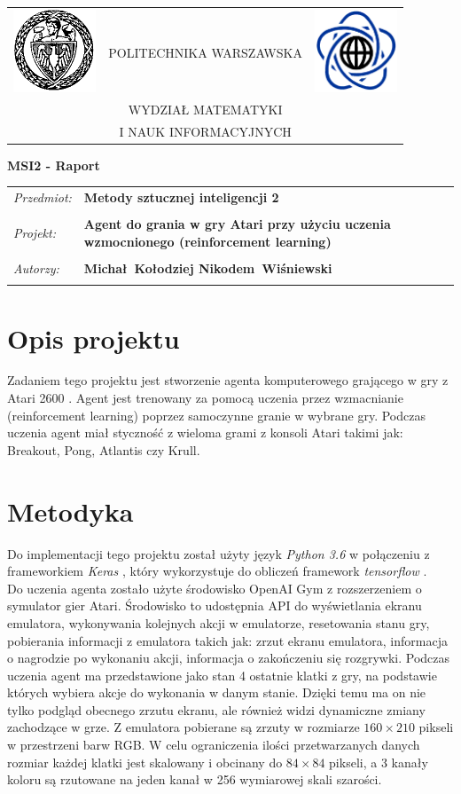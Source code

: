 \documentclass[12pt]{article}
\renewcommand{\maketitle}{
\begin{titlepage}
\begin{table}[t]
\centering
\begin{tabular}[t]{lcr}
 \includegraphics[width=70pt,height=70pt]{PW} & POLITECHNIKA WARSZAWSKA & \includegraphics[width=70pt,height=70pt]{MiNI}\\
& WYDZIAŁ MATEMATYKI & \\
& I NAUK INFORMACYJNYCH &
\end{tabular}
\end{table}
\vspace*{3cm}
  \begin{center}
    \LARGE
    \textbf {MSI2 - Raport}\\
   \vspace*{2 cm}
\begin{table}[!htp]
\begin{tabular}{p{4cm}p{9cm}}
\textit{Przedmiot:} &\textbf {Metody sztucznej inteligencji 2} \\
\\
\textit{Projekt:} &\textbf {Agent do grania w gry Atari przy użyciu uczenia wzmocnionego (reinforcement learning)} \\
\\
\textit{Autorzy:} &\textbf {Michał~Kołodziej \newline Nikodem~Wiśniewski} \\
\\
\end{tabular}
\end{table}

\vspace{5 cm}
  \center{\small Warszawa, dnia \today}
\end{center}
\end{titlepage}
}
\begin{document}
\maketitle

\tableofcontents

\newpage

\section{Opis projektu}
Zadaniem tego projektu jest stworzenie agenta komputerowego grającego w gry z Atari 2600 \cite{atari}. Agent jest trenowany za pomocą uczenia przez wzmacnianie (reinforcement learning) poprzez samoczynne granie w wybrane gry. Podczas uczenia agent miał styczność z wieloma grami z konsoli Atari takimi jak: Breakout, Pong, Atlantis czy Krull.

\section{Metodyka}

Do implementacji tego projektu został użyty język \textit{Python 3.6} w połączeniu z frameworkiem \textit{Keras} \cite{keras}, który wykorzystuje do obliczeń framework \textit{tensorflow} \cite{tensorflow}. \\
Do uczenia agenta zostało użyte środowisko OpenAI Gym \cite{gym} z rozszerzeniem o symulator gier Atari. Środowisko to udostępnia API do wyświetlania ekranu emulatora, wykonywania kolejnych akcji w emulatorze, resetowania stanu gry, pobierania informacji z emulatora takich jak: zrzut ekranu emulatora, informacja o nagrodzie po wykonaniu akcji, informacja o zakończeniu się rozgrywki. Podczas uczenia agent ma przedstawione jako stan 4 ostatnie klatki z gry, na podstawie których wybiera akcje do wykonania w danym stanie. Dzięki temu ma on nie tylko podgląd obecnego zrzutu ekranu, ale również widzi dynamiczne zmiany zachodzące w grze. Z emulatora pobierane są zrzuty w rozmiarze $160\times210$ pikseli w przestrzeni barw RGB. W celu ograniczenia ilości przetwarzanych danych rozmiar każdej klatki jest skalowany i obcinany do $84\times84$ pikseli, a 3 kanały koloru są rzutowane na jeden kanał w 256 wymiarowej skali szarości.
\\\
\end{document}
